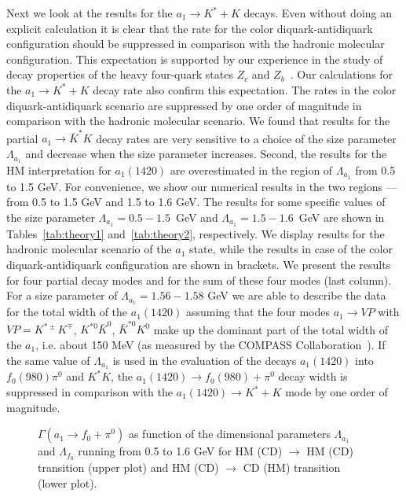 \documentclass[aps,prd,floatfix,superscriptaddress,showpacs,showkeys]{revtex4}
\begin{document}
Next we look at the results for the $a_1 \to K^* + K$ decays. 
Even without doing an explicit calculation it is clear that the rate for the 
color diquark-antidiquark configuration
should be suppressed in comparison with 
the hadronic molecular configuration. This expectation is supported by our 
experience in the study of decay properties of the heavy 
four-quark states $Z_c$ and $Z_b$~\cite{Goerke:2016hxf,Goerke:2017svb}. 
Our calculations for the $a_1 \to K^* + K$ decay rate also confirm this 
expectation. The rates in the color diquark-antidiquark scenario 
are suppressed by one order of magnitude in comparison with the 
hadronic molecular scenario. We found that results for the 
partial $a_1 \to \bar K^* K$ decay rates are very sensitive to a choice of the 
size parameter $\Lambda_{a_1}$ and decrease when the size parameter increases. 
Second, the results for the HM interpretation for $a_1(1420)$ are 
overestimated in the region of $\Lambda_{a_1}$ from 0.5 to 1.5 GeV. 
For convenience, we show our numerical results 
in the two regions --- from 0.5 to 1.5 GeV and 1.5 to 1.6 GeV. 
The results for some specific values of the size parameter 
$\Lambda_{a_1} = 0.5 - 1.5$~GeV and 
$\Lambda_{a_1} = 1.5 - 1.6$~GeV are shown 
in Tables~\ref{tab:theory1} and~\ref{tab:theory2}, respectively.  
We display results for the hadronic molecular 
scenario of the $a_1$ state, while the results in case 
of the color diquark-antidiquark configuration are shown in brackets. 
We present the results for four partial decay modes and for the sum of 
these four modes (last column).  
For a size parameter of 
$\Lambda_{a_1} = 1.56-1.58$ GeV we are able to describe the data 
for the total width of the $a_1(1420)$ assuming that the four modes 
$a_1 \to VP$ with $VP = K^{*\pm}K^\mp$, 
$K^{*0}\bar K^0$, $\bar K^{*0}K^0$ make up the dominant
part of the total width of the $a_1$, 
i.e. about 150 MeV (as measured by the 
COMPASS Collaboration~\cite{Adolph:2015pws}).   
If the same value of $\Lambda_{a_1}$ is used in the
evaluation 
of the decays $a_1(1420)$ into $f_0(980) \pi^0$ and $K^* K$, 
the $a_1(1420) \to f_0(980) + \pi^0$
decay width is suppressed in comparison with the 
$a_1(1420) \to K^* + K$ mode by one order of magnitude. 

\begin{figure}
\begin{center}
\end{center}
\noindent
\caption{$\Gamma(a_1 \to f_0 + \pi^0)$ 
as function of the dimensional parameters
$\Lambda_{a_1}$ and $\Lambda_{f_0}$ running from 0.5 to 1.6 GeV
for HM (CD) $\to$ HM (CD) transition (upper plot) and
HM (CD) $\to$ CD (HM) transition (lower plot).} 
\end{figure}
\end{document}
